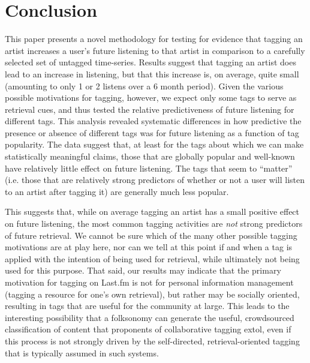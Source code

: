 \documentclass[preprint]{sig-alternate-2013}
\begin{document}
\section{Conclusion}
This paper presents a novel methodology for testing for evidence that tagging an artist increases a user's future listening to that artist in comparison to a carefully selected set of untagged time-series. Results suggest that tagging an artist does lead to an increase in listening, but that this increase is, on average, quite small (amounting to only 1 or 2 listens over a 6 month period). Given the various possible motivations for tagging, however, we expect only some tags to serve as retrieval cues, and thus tested the relative predictiveness of future listening for different tags. This analysis revealed systematic differences in how predictive the presence or absence of different tags was for future listening as a function of tag popularity. The data suggest that, at least for the tags about which we can make statistically meaningful claims, those that are globally popular and well-known have relatively little effect on future listening. The tags that seem to ``matter'' (i.e. those that are relatively strong predictors of whether or not a user will listen to an artist after tagging it) are generally much less popular.

This suggests that, while on average tagging an artist  has a small positive effect on future listening, the most common tagging activities are \emph{not} strong predictors of future retrieval. We cannot be sure which of the many other possible tagging motivations are at play here, nor can we tell at this point if and when a tag is applied with the intention of being used for retrieval, while ultimately not being used for this purpose. That said, our results may indicate that the primary motivation for tagging on Last.fm is not for personal information management (tagging a resource for one's own retrieval), but rather may be socially oriented, resulting in tags that are useful for the community at large. This leads to the interesting possibility that a folksonomy can generate the useful, crowdsourced classification of content that proponents of collaborative tagging extol, even if this process is not strongly driven by the self-directed, retrieval-oriented tagging that is typically assumed in such systems.





\end{document}
